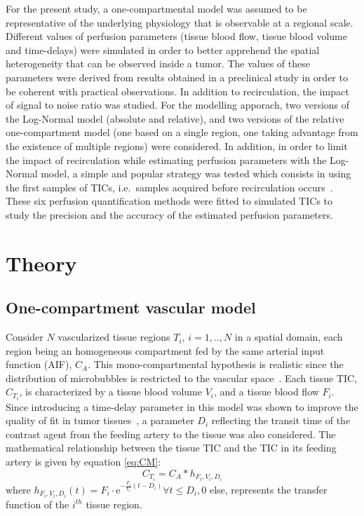 For the present study, a one-compartmental model was assumed to be representative of the underlying physiology that is observable at a regional scale. Different values of perfusion parameters (tissue blood flow, tissue blood volume and time-delays) were simulated in order to better apprehend the spatial heterogeneity that can be observed inside a tumor. The values of these parameters were derived from results obtained in a preclinical study in order to be coherent with practical observations. In addition to recirculation, the impact of signal to noise ratio was  studied. For the modelling apporach, two versions of the Log-Normal model (absolute and relative), and two versions of the relative one-compartment model (one based on a single region, one taking advantage from the existence of multiple regions) were considered. In addition, in order to limit the impact of recirculation while estimating perfusion parameters with the Log-Normal model, a simple and popular strategy was tested which consists in using the first samples of TICs, i.e.~samples acquired before recirculation occurs~\cite{Lowerison2017}. These six perfusion quantification methods were fitted to simulated TICs to study the precision and  the accuracy of the estimated perfusion parameters. 

\section{Theory}

\subsection{One-compartment vascular model}
\label{sec:simmdl}
Consider $N$ vascularized tissue regions $T_i$, $i=1,..,N$ in a spatial domain, each region being an homogeneous compartment fed by the same arterial input function (AIF), $C_A$. This mono-compartmental hypothesis is realistic since the distribution of microbubbles is restricted to the vascular space~\cite{Gunn:2001cx}. Each tissue TIC, $C_{T_i}$, is characterized by a tissue blood volume $V_i$, and a tissue blood flow $F_i$. Since introducing a time-delay parameter in this model was shown to improve the quality of fit in tumor tissues~\cite{Doury:2017fz}, a parameter $D_i$ reflecting the transit time of the contrast agent from the feeding artery to the tissue was also considered. 
The mathematical relationship between the tissue TIC and the TIC in its feeding artery is given by equation \ref{eq:CM}:
\begin{equation}
 C_{T_i} = C_A \ast h_{F_i,V_i,D_i}
\label{eq:CM}
\end{equation}
where $h_{F_i,V_i,D_i} (t) = F_i \cdot \mathrm{e}^{-\frac{F_i}{V_i} \left( t - D_i \right)}\forall t \leq D_i, 0$ else, represents the transfer function of the $i^{th}$ tissue region.

